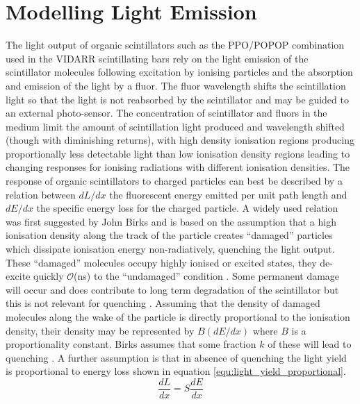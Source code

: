 \section{Modelling Light Emission}\label{sec:GEANT4Simulation_ModellingLightEmission}
The light output of organic scintillators such as the PPO/POPOP combination used in the VIDARR scintillating bars rely on the light emission of the scintillator molecules following excitation by ionising particles and the absorption and emission of the light by a fluor. The fluor wavelength shifts the scintillation light so that the light is not reabsorbed by the scintillator and may be guided to an external photo-sensor. The concentration of scintillator and fluors in the medium limit the amount of scintillation light produced and wavelength shifted (though with diminishing returns), with high density ionisation regions producing proportionally less detectable light than low ionisation density regions leading to changing responses for ionising radiations with different ionisation densities. The response of organic scintillators to charged particles can best be described by a relation between $dL/dx$ the fluorescent energy emitted per unit path length and $dE/dx$ the specific energy loss for the charged particle. A widely used relation was first suggested by John Birks \cite{birks_1964} and is based on the assumption that a high ionisation density along the track of the particle creates ``damaged'' particles which dissipate ionisation energy non-radiatively, quenching the light output. These “damaged” molecules occupy highly ionised or excited states, they de-excite quickly $\mathcal{O}$(ns) to the “undamaged” condition \cite{knoll_2010}. Some permanent damage will occur and does contribute to long term degradation of the scintillator but this is not relevant for quenching \cite{knoll_2010}. Assuming that the density of damaged molecules along the wake of the particle is directly proportional to the ionisation density, their density may be represented by $B(dE/dx)$ where $B$ is a proportionality constant. Birks assumes that some fraction $k$ of these will lead to quenching \cite{craun_1970}. A further assumption is that in absence of quenching the light yield is proportional to energy loss shown in equation \ref{equ:light_yield_proportional}.
\begin{equation}
\frac{dL}{dx} = S\frac{dE}{dx}
\label{equ:light_yield_proportional}
\end{equation}
